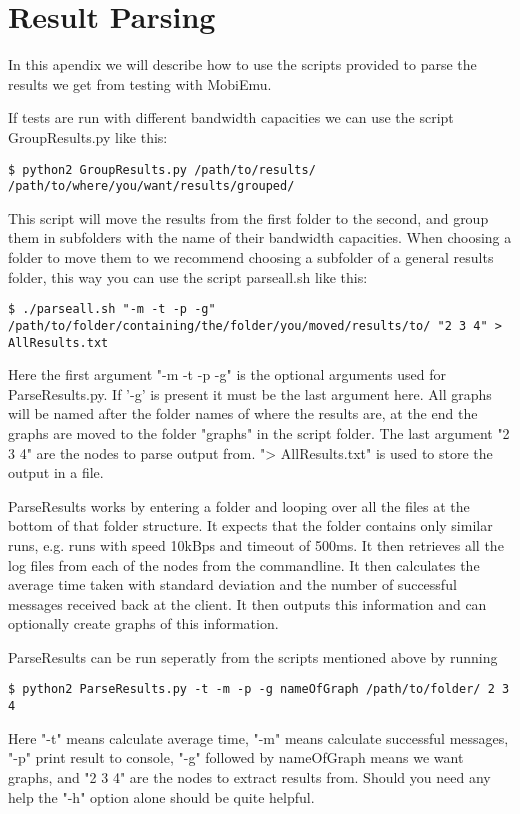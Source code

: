 \section{Result Parsing}\label{Result Parsing}
    In this apendix we will describe how to use the scripts provided to parse the results we get from testing with MobiEmu.
    
    If tests are run with different bandwidth capacities we can use the script GroupResults.py like this:
    \lstset{language=bash, style=shell}
    \begin{lstlisting}
$ python2 GroupResults.py /path/to/results/ /path/to/where/you/want/results/grouped/
    \end{lstlisting}
    This script will move the results from the first folder to the second, and group them in subfolders with the name of their bandwidth capacities. When choosing a folder to move them to we recommend choosing a subfolder of a general results folder, this way you can use the script parseall.sh like this:
    \begin{lstlisting}
$ ./parseall.sh "-m -t -p -g" /path/to/folder/containing/the/folder/you/moved/results/to/ "2 3 4" > AllResults.txt
    \end{lstlisting}
    Here the first argument "-m -t -p -g" is the optional arguments used for ParseResults.py. If '-g' is present it must be the last argument here. All graphs will be named after the folder names of where the results are, at the end the graphs are moved to the folder "graphs" in the script folder. The last argument "2 3 4" are the nodes to parse output from. "> AllResults.txt" is used to store the output in a file.
    
    ParseResults works by entering a folder and looping over all the files at the bottom of that folder structure. It expects that the folder contains only similar runs, e.g. runs with speed 10kBps and timeout of 500ms. It then retrieves all the log files from each of the nodes from the commandline. It then calculates the average time taken with standard deviation and the number of successful messages received back at the client. It then outputs this information and can optionally create graphs of this information.
    
    ParseResults can be run seperatly from the scripts mentioned above by running
    \begin{lstlisting}
$ python2 ParseResults.py -t -m -p -g nameOfGraph /path/to/folder/ 2 3 4
    \end{lstlisting}
    Here "-t" means calculate average time, "-m" means calculate successful messages, "-p" print result to console, "-g" followed by nameOfGraph means we want graphs, and "2 3 4" are the nodes to extract results from. Should you need any help the "-h" option alone should be quite helpful.
